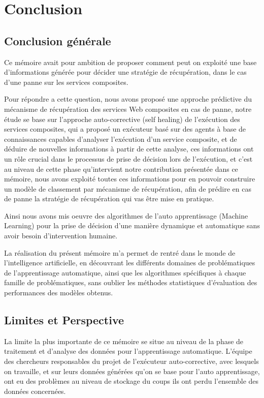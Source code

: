 \chapter{Conclusion}

\section{Conclusion générale}

Ce mémoire avait pour ambition de proposer comment peut on exploité une base d'informations générée pour décider une stratégie de récupération, dans le cas d'une panne sur les services composites. 

Pour répondre a cette question, nous avons proposé une approche prédictive du mécanisme de récupération des services Web composites en cas de panne, notre étude se base sur l'approche auto-corrective (self healing) de l'exécution des services composites, qui a proposé un exécuteur basé sur des agents à base de connaissances capables d'analyser l'exécution d'un service composite, et de déduire de nouvelles informations à partir de cette analyse, ces informations ont un rôle crucial dans le processus de prise de décision lors de l'exécution, et c'est au niveau de cette phase qu'intervient notre contribution présentée dans ce mémoire, nous avons exploité toutes ces informations pour en pouvoir construire un modèle de classement par mécanisme de récupération, afin de prédire en cas de panne la stratégie de récupération qui vas être mise en pratique. 

Ainsi nous avons mis oeuvre des algorithmes de l'auto apprentissage (Machine Learning) pour la prise de décision d'une manière dynamique et automatique sans avoir besoin d'intervention humaine.

La réalisation du présent mémoire m'a permet de rentré dans le monde de l'intelligence artificielle, en découvrant les différents domaines de problématiques de l'apprentissage automatique, ainsi que les algorithmes spécifiques à chaque famille de problématiques, sans oublier les méthodes statistiques d'évaluation des performances des modèles obtenus.

\section{Limites et Perspective }

La limite la plus importante de ce mémoire se situe au niveau de la phase de traitement et d'analyse des données pour l'apprentissage automatique.
L'équipe des chercheurs responsables du projet de l'exécuteur auto-corrective, avec lesquels on travaille, et sur leurs données générées qu'on se base pour l'auto apprentissage, ont eu des problèmes au niveau de stockage du coups ils ont perdu l'ensemble des données concernées.


